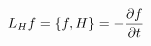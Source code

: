\documentclass[preview]{standalone}
\begin{document}
\begin{align*}
\special{dvisvgm:raw <g id='unique000'>}L_H f = \{f, H\} = -\frac{\partial f}{\partial t}\special{dvisvgm:raw </g>}
\end{align*}
\end{document}
